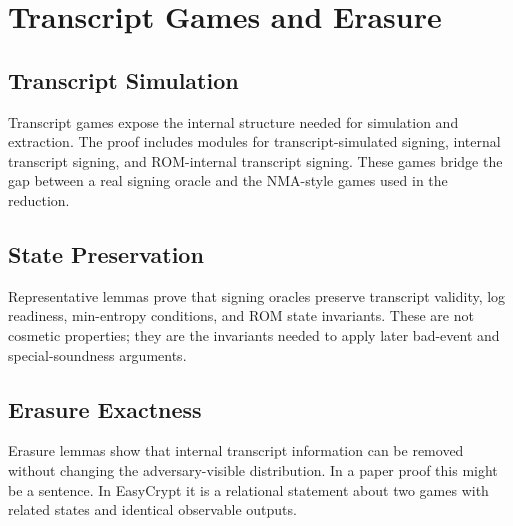 \chapter{Transcript Games and Erasure}
\label{ch:transcripts}

\section{Transcript Simulation}

Transcript games expose the internal structure needed for simulation and
extraction.  The proof includes modules for transcript-simulated signing,
internal transcript signing, and ROM-internal transcript signing.  These games
bridge the gap between a real signing oracle and the NMA-style games used in the
reduction.

\section{State Preservation}

Representative lemmas prove that signing oracles preserve transcript validity,
log readiness, min-entropy conditions, and ROM state invariants.  These are not
cosmetic properties; they are the invariants needed to apply later bad-event and
special-soundness arguments.

\section{Erasure Exactness}

Erasure lemmas show that internal transcript information can be removed without
changing the adversary-visible distribution.  In a paper proof this might be a
sentence.  In EasyCrypt it is a relational statement about two games with
related states and identical observable outputs.
